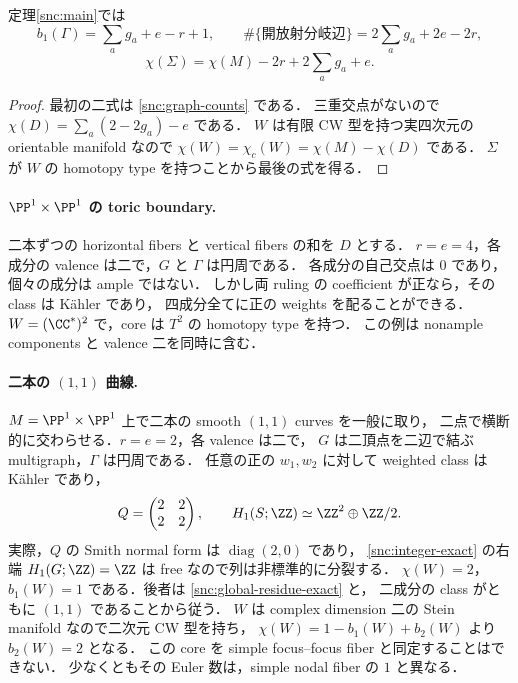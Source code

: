 \begin{corollary}
\label{snc:counts}
定理\ref{snc:main}では
\[
 b_1(\Gamma)=\sum_a g_a+e-r+1,\qquad
 \#\{\text{開放射分岐辺}\}=2\sum_a g_a+2e-2r,
\]
\[
 \chi(\Sigma)=\chi(M)-2r+2\sum_a g_a+e.
\]
\end{corollary}
\begin{proof}
最初の二式は \eqref{snc:graph-counts} である．
三重交点がないので $\chi(D)=\sum_a(2-2g_a)-e$ である．
$W$ は有限 CW 型を持つ実四次元の orientable manifold なので
$\chi(W)=\chi_c(W)=\chi(M)-\chi(D)$ である．
$\Sigma$ が $W$ の homotopy type を持つことから最後の式を得る．
\end{proof}

\paragraph{$\PP^1\times\PP^1$ の toric boundary.}
二本ずつの horizontal fibers と vertical fibers の和を $D$ とする．
$r=e=4$，各成分の valence は二で，$G$ と $\Gamma$ は円周である．
各成分の自己交点は $0$ であり，個々の成分は ample ではない．
しかし両 ruling の coefficient が正なら，その class は Kähler であり，
四成分全てに正の weights を配ることができる．
$W=(\CC^*)^2$ で，core は $T^2$ の homotopy type を持つ．
この例は nonample components と valence 二を同時に含む．

\paragraph{二本の $(1,1)$ 曲線.}
$M=\PP^1\times\PP^1$ 上で二本の smooth $(1,1)$ curves を一般に取り，
二点で横断的に交わらせる．$r=e=2$，各 valence は二で，
$G$ は二頂点を二辺で結ぶ multigraph，$\Gamma$ は円周である．
任意の正の $w_1,w_2$ に対して weighted class は Kähler であり，
\[
 Q=\begin{pmatrix}2&2\\2&2\end{pmatrix},\qquad
 H_1(S;\ZZ)\simeq\ZZ^2\oplus\ZZ/2.
\]
実際，$Q$ の Smith normal form は $\operatorname{diag}(2,0)$ であり，
\eqref{snc:integer-exact} の右端 $H_1(G;\ZZ)=\ZZ$ は free なので列は非標準的に分裂する．
$\chi(W)=2$，$b_1(W)=1$ である．後者は \eqref{snc:global-residue-exact} と，
二成分の class がともに $(1,1)$ であることから従う．
$W$ は complex dimension 二の Stein manifold なので二次元 CW 型を持ち，
$\chi(W)=1-b_1(W)+b_2(W)$ より $b_2(W)=2$ となる．
この core を simple focus--focus fiber と同定することはできない．
少なくともその Euler 数は，simple nodal fiber の $1$ と異なる．


